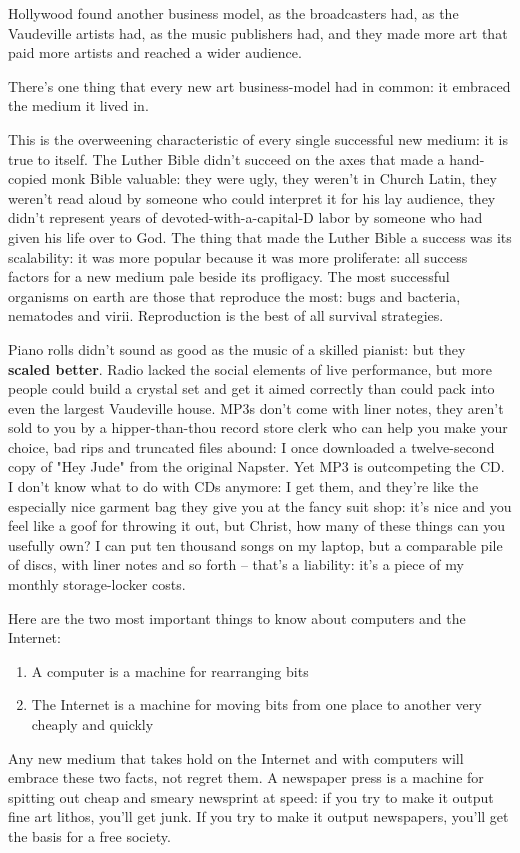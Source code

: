 Hollywood found another business model, as the broadcasters had, as
the Vaudeville artists had, as the music publishers had, and they
made more art that paid more artists and reached a wider audience.

There's one thing that every new art business-model had in common:
it embraced the medium it lived in.

This is the overweening characteristic of every single successful
new medium: it is true to itself. The Luther Bible didn't succeed
on the axes that made a hand-copied monk Bible valuable: they were
ugly, they weren't in Church Latin, they weren't read aloud by
someone who could interpret it for his lay audience, they didn't
represent years of devoted-with-a-capital-D labor by someone who
had given his life over to God. The thing that made the Luther
Bible a success was its scalability: it was more popular because it
was more proliferate: all success factors for a new medium pale
beside its profligacy. The most successful organisms on earth are
those that reproduce the most: bugs and bacteria, nematodes and
virii. Reproduction is the best of all survival strategies.

Piano rolls didn't sound as good as the music of a skilled pianist:
but they \textbf{scaled better}. Radio lacked the social elements
of live performance, but more people could build a crystal set and
get it aimed correctly than could pack into even the largest
Vaudeville house. MP3s don't come with liner notes, they aren't
sold to you by a hipper-than-thou record store clerk who can help
you make your choice, bad rips and truncated files abound: I once
downloaded a twelve-second copy of "Hey Jude" from the original
Napster. Yet MP3 is outcompeting the CD. I don't know what to do
with CDs anymore: I get them, and they're like the especially nice
garment bag they give you at the fancy suit shop: it's nice and you
feel like a goof for throwing it out, but Christ, how many of these
things can you usefully own? I can put ten thousand songs on my
laptop, but a comparable pile of discs, with liner notes and so
forth -- that's a liability: it's a piece of my monthly
storage-locker costs.

Here are the two most important things to know about computers and
the Internet:

\begin{enumerate}
\item
  A computer is a machine for rearranging bits
\item
  The Internet is a machine for moving bits from one place to another
  very cheaply and quickly
\end{enumerate}
Any new medium that takes hold on the Internet and with computers
will embrace these two facts, not regret them. A newspaper press is
a machine for spitting out cheap and smeary newsprint at speed: if
you try to make it output fine art lithos, you'll get junk. If you
try to make it output newspapers, you'll get the basis for a free
society.

